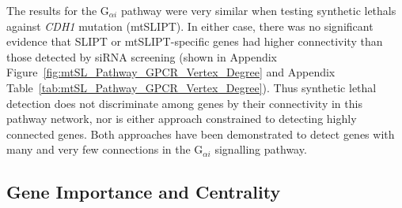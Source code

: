\begin{table*}[!htb]
\caption{\acrshort{ANOVA} for synthetic lethality and vertex degree}
\label{tab:SL_Pathway_GPCR_Vertex_Degree}
\noindent{}
\end{table*} \filbreak

The results for the G$_{\alpha i}$ \gls{pathway} were very similar when testing \glspl{synthetic lethal} against \textit{CDH1} \gls{mutation} (\acrshort{mtSLIPT}). In either case, there was no significant evidence that \gls{SLIPT} or \acrshort{mtSLIPT}-specific genes had higher connectivity than those detected by \gls{siRNA} screening (shown in Appendix Figure~\ref{fig:mtSL_Pathway_GPCR_Vertex_Degree} and Appendix Table~\ref{tab:mtSL_Pathway_GPCR_Vertex_Degree}). Thus \gls{synthetic lethal} detection does not discriminate among genes by their connectivity in this \gls{pathway} network, nor is either approach constrained to detecting highly connected genes. Both approaches have been demonstrated to detect genes with many and very few connections in the G$_{\alpha i}$ signalling \gls{pathway}.

\FloatBarrier

\subsection{Gene Importance and Centrality}  \label{chapt4:Network_Centrality}

